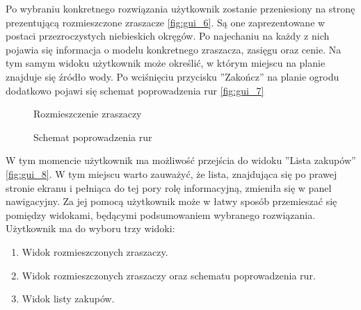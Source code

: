 \documentclass[twoside]{iisthesis}
\begin{document}
Po wybraniu konkretnego rozwiązania użytkownik zostanie przeniesiony na stronę prezentującą rozmieszczone zraszacze \eqref{fig:gui_6}. Są one zaprezentowane w postaci przezroczystych niebieskich okręgów. Po najechaniu na każdy z nich pojawia się informacja o modelu konkretnego zraszacza, zasięgu oraz cenie. Na tym samym widoku użytkownik może określić, w którym miejscu na planie znajduje się źródło wody. Po wciśnięciu przycisku ''Zakończ'' na planie ogrodu dodatkowo pojawi się schemat poprowadzenia rur \eqref{fig:gui_7}
\begin{figure}[!htb]
	\centering
	\caption{Rozmieszczenie zraszaczy}
	\label{fig:gui_6}
\end{figure}
\begin{figure}[!htb]
	\centering
	\caption{Schemat poprowadzenia rur}
	\label{fig:gui_7}
\end{figure}

W tym momencie użytkownik ma możliwość przejścia do widoku ''Lista zakupów'' \eqref{fig:gui_8}. W tym miejscu warto zauważyć, że lista, znajdująca się po prawej stronie ekranu i pełniąca do tej pory rolę informacyjną, zmieniła się w panel nawigacyjny. Za jej pomocą użytkownik może w łatwy sposób przemieszać się pomiędzy widokami, będącymi podsumowaniem wybranego rozwiązania. Użytkownik ma do wyboru trzy widoki:\\
\begin{enumerate}
	\item Widok rozmieszczonych zraszaczy.
	\item Widok rozmieszczonych zraszaczy oraz schematu poprowadzenia rur.
	\item Widok listy zakupów.\\
\end{enumerate}
\end{document}

